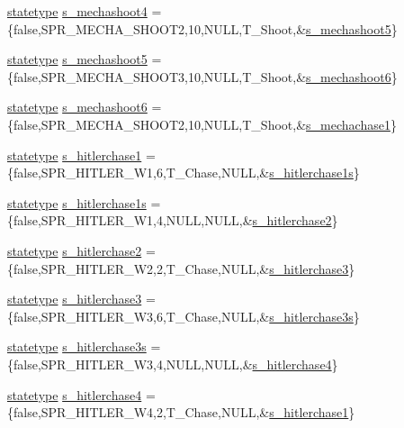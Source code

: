 \begin{DoxyCompactItemize}
\item 
\hyperlink{structstatestruct}{statetype} \hyperlink{WL__ACT2_8C_a4ede11ddad980badf517d93bc02fd4d0}{s\_\-mechashoot4} = \{false,SPR\_\-MECHA\_\-SHOOT2,10,NULL,T\_\-Shoot,\&\hyperlink{WL__ACT2_8C_a759fd366c222fc6c47d1f0462078f03c}{s\_\-mechashoot5}\}
\item 
\hyperlink{structstatestruct}{statetype} \hyperlink{WL__ACT2_8C_a759fd366c222fc6c47d1f0462078f03c}{s\_\-mechashoot5} = \{false,SPR\_\-MECHA\_\-SHOOT3,10,NULL,T\_\-Shoot,\&\hyperlink{WL__ACT2_8C_a90feaf399c73db25e839142d6c61a84c}{s\_\-mechashoot6}\}
\item 
\hyperlink{structstatestruct}{statetype} \hyperlink{WL__ACT2_8C_a90feaf399c73db25e839142d6c61a84c}{s\_\-mechashoot6} = \{false,SPR\_\-MECHA\_\-SHOOT2,10,NULL,T\_\-Shoot,\&\hyperlink{WL__DEF_8H_a7fd4292362075e6baaf13d0148e5c631}{s\_\-mechachase1}\}
\item 
\hyperlink{structstatestruct}{statetype} \hyperlink{WL__ACT2_8C_aa89b8ca9d464e45092cc99529d5abef4}{s\_\-hitlerchase1} = \{false,SPR\_\-HITLER\_\-W1,6,T\_\-Chase,NULL,\&\hyperlink{WL__ACT2_8C_ad6fab59f3a334df59d3037a705c072da}{s\_\-hitlerchase1s}\}
\item 
\hyperlink{structstatestruct}{statetype} \hyperlink{WL__ACT2_8C_ad6fab59f3a334df59d3037a705c072da}{s\_\-hitlerchase1s} = \{false,SPR\_\-HITLER\_\-W1,4,NULL,NULL,\&\hyperlink{WL__ACT2_8C_add95d80cb6d278641cdad052769e29a6}{s\_\-hitlerchase2}\}
\item 
\hyperlink{structstatestruct}{statetype} \hyperlink{WL__ACT2_8C_add95d80cb6d278641cdad052769e29a6}{s\_\-hitlerchase2} = \{false,SPR\_\-HITLER\_\-W2,2,T\_\-Chase,NULL,\&\hyperlink{WL__ACT2_8C_a62624eaaaca44b10e1db9922b7bb9433}{s\_\-hitlerchase3}\}
\item 
\hyperlink{structstatestruct}{statetype} \hyperlink{WL__ACT2_8C_a62624eaaaca44b10e1db9922b7bb9433}{s\_\-hitlerchase3} = \{false,SPR\_\-HITLER\_\-W3,6,T\_\-Chase,NULL,\&\hyperlink{WL__ACT2_8C_a20c282c075c0b1b525d887f2169e22c4}{s\_\-hitlerchase3s}\}
\item 
\hyperlink{structstatestruct}{statetype} \hyperlink{WL__ACT2_8C_a20c282c075c0b1b525d887f2169e22c4}{s\_\-hitlerchase3s} = \{false,SPR\_\-HITLER\_\-W3,4,NULL,NULL,\&\hyperlink{WL__ACT2_8C_a196f97a60134c7961016bcb8086bafbe}{s\_\-hitlerchase4}\}
\item 
\hyperlink{structstatestruct}{statetype} \hyperlink{WL__ACT2_8C_a196f97a60134c7961016bcb8086bafbe}{s\_\-hitlerchase4} = \{false,SPR\_\-HITLER\_\-W4,2,T\_\-Chase,NULL,\&\hyperlink{WL__DEF_8H_aa89b8ca9d464e45092cc99529d5abef4}{s\_\-hitlerchase1}\}

\end{DoxyCompactItemize}

